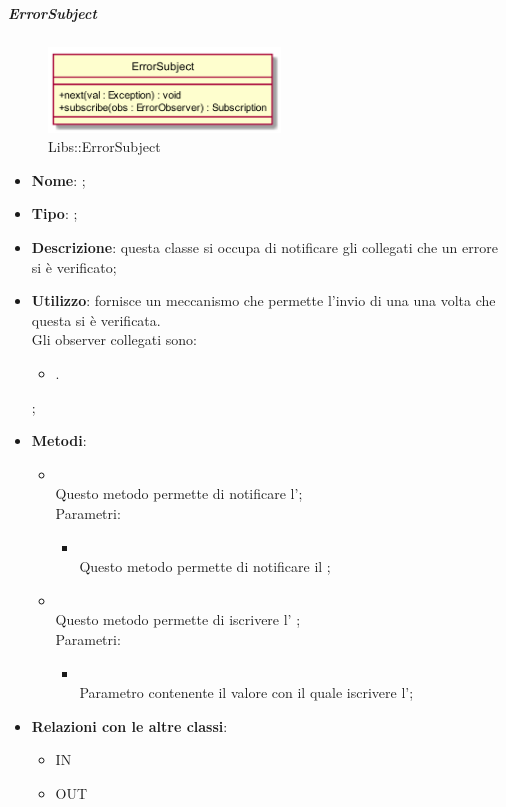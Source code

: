 \hypertarget{ErrorSubject_label}{\subparagraph{ErrorSubject}}
\begin{figure}[h]
	\centering
	\includegraphics[width=0.55\textwidth,height=\textheight,keepaspectratio]{images/ClassErrorSubject.png}
	\caption{Libs::ErrorSubject}
\end{figure}
\begin{itemize}
	\item \textbf{Nome}: ;
	\item \textbf{Tipo}: ;
	\item \textbf{Descrizione}: questa classe si occupa di notificare gli  collegati che un errore si è verificato;
	\item \textbf{Utilizzo}: fornisce un meccanismo che permette l'invio di una  una volta che questa si è verificata.\\
 Gli observer collegati sono:
\begin{itemize}
\item {}.
\end{itemize};
	\item \textbf{Metodi}:
	\begin{itemize}
		\item[]  \\		Questo metodo permette di notificare l';\\
		Parametri:
		\begin{itemize}
			\item {} \\
			Questo metodo permette di notificare il ;
		\end{itemize}
		\item[]  \\			Questo metodo permette di iscrivere l' ;\\
		Parametri:
		\begin{itemize}
			\item {} \\
			Parametro contenente il valore con il quale iscrivere l';
		\end{itemize}
	\end{itemize}
	\item \textbf{Relazioni con le altre classi}:
	\begin{itemize}
		\item IN \hyperlink{Exception_label}{}
		\item OUT \hyperlink{ErrorObserver_label}{}
	\end{itemize}
\end{itemize}
\FloatBarrier

